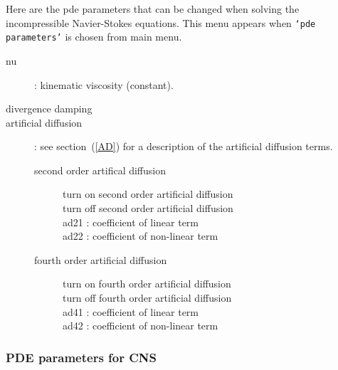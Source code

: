  Here are the pde parameters that can be changed when solving the incompressible Navier-Stokes equations.
 This menu appears when {\tt `pde parameters'} is chosen from main menu.
\begin{description}
  \item[nu] : kinematic viscosity (constant).
  \item[divergence damping]
  \item[artificial diffusion] : see section~(\ref{AD}) for a description of the artificial diffusion terms.
    \begin{description}
      \item[second order artifical diffusion]
        \begin{description}
          \item[turn on second order artificial diffusion]
          \item[turn off second order artificial diffusion]
          \item[ad21 : coefficient of linear term]
          \item[ad22 : coefficient of non-linear term]
        \end{description}
      \item[fourth order artificial diffusion]
        \begin{description}
          \item[turn on fourth order artificial diffusion]
          \item[turn off fourth order artificial diffusion]
          \item[ad41 : coefficient of linear term]
          \item[ad42 : coefficient of non-linear term]
        \end{description}
    \end{description}
  \end{description}

\subsubsection{PDE parameters for CNS}\label{sec:cnsPdeParams}
 

